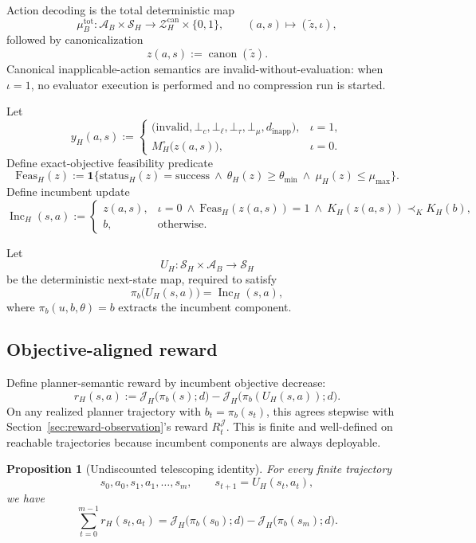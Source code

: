 \documentclass[11pt]{article}
\newtheorem{proposition}{Proposition}
\begin{document}
Action decoding is the total deterministic map
\[
\mu_B^{\mathrm{tot}}:\mathcal{A}_B\times\mathcal{S}_H\to
\mathcal{Z}_H^{\mathrm{can}}\times\{0,1\},
\qquad
(a,s)\mapsto(\tilde z,\iota),
\]
followed by canonicalization
\[
z(a,s):=\operatorname{canon}(\tilde z).
\]
Canonical inapplicable-action semantics are invalid-without-evaluation:
when $\iota=1$, no evaluator execution is performed and no compression run is
started.

Let
\[
y_H(a,s):=
\begin{cases}
\bigl(\mathrm{invalid},\bot_c,\bot_\ell,\bot_\tau,\bot_\mu,d_{\mathrm{inapp}}\bigr),
& \iota=1,\\[3pt]
M_H^\circ\bigl(z(a,s)\bigr),
& \iota=0.
\end{cases}
\]
Define exact-objective feasibility predicate
\[
\mathrm{Feas}_H(z):=\mathbf{1}\{\mathrm{status}_H(z)=\mathrm{success}\ \land\ \theta_H(z)\ge\theta_{\min}\ \land\ \mu_H(z)\le\mu_{\max}\}.
\]
Define incumbent update
\[
\operatorname{Inc}_H(s,a):=
\begin{cases}
z(a,s),
& \iota=0\ \land\ \mathrm{Feas}_H(z(a,s))=1
\ \land\
K_H(z(a,s))\prec_K K_H(b),\\[3pt]
b,
& \text{otherwise.}
\end{cases}
\]

Let
\[
U_H:\mathcal{S}_H\times\mathcal{A}_B\to\mathcal{S}_H
\]
be the deterministic next-state map, required to satisfy
\[
\pi_b\bigl(U_H(s,a)\bigr)=\operatorname{Inc}_H(s,a),
\]
where $\pi_b(u,b,\theta)=b$ extracts the incumbent component.

\subsection{Objective-aligned reward}

Define planner-semantic reward by incumbent objective decrease:
\[
r_H(s,a):=\mathcal{J}_H\!\bigl(\pi_b(s);d\bigr)-\mathcal{J}_H\!\bigl(\pi_b(U_H(s,a));d\bigr).
\]
On any realized planner trajectory with $b_t=\pi_b(s_t)$, this agrees
stepwise with Section~\ref{sec:reward-observation}'s reward
$R_t^{\mathcal{J}}$.
This is finite and well-defined on reachable trajectories because incumbent
components are always deployable.

\begin{proposition}[Undiscounted telescoping identity]\label{prop:telescoping}
For every finite trajectory
\[
s_0,a_0,s_1,a_1,\dots,s_m,
\qquad
s_{t+1}=U_H(s_t,a_t),
\]
we have
\[
\sum_{t=0}^{m-1} r_H(s_t,a_t)
=
\mathcal{J}_H\!\bigl(\pi_b(s_0);d\bigr)-\mathcal{J}_H\!\bigl(\pi_b(s_m);d\bigr).
\]
\end{proposition}
\end{document}
